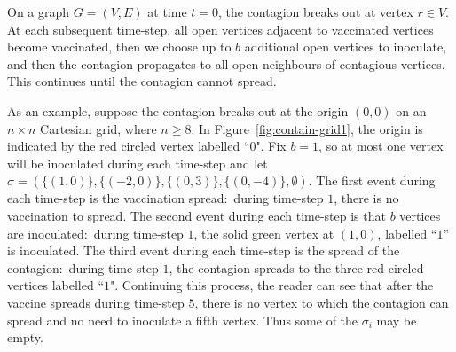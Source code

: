 \documentclass[unknownkeysallowed]{article}
\makeatletter
\theoremstyle{definition}\newtheorem{strategy}{Strategy}
\theoremstyle{definition}\newtheorem{notation}{Notation}[theorem]
\newcommand{\name}[1]{\gdef\@name{#1}}%
\newcommand{\instance}[1]{\gdef\@instance{#1}}%
\newcommand{\question}[1]{\gdef\@question{#1}}%
\newcommand*{\IV}{\textup{\textsc{InfectVax}}\xspace}
\makeatother
\begin{document}
On a graph $G=(V, E)$ at time $t=0$, the contagion breaks out at vertex $r\in V$. At each subsequent time-step, all open vertices adjacent to vaccinated vertices become vaccinated, then we choose up to $b$ additional open vertices to inoculate, and then the contagion propagates to all open neighbours of contagious vertices. This continues until the contagion cannot spread. 

\begin{problem}
    \name{\IV}
      \instance{A graph $G=(V, E)$, a root vertex $r\in V$, a budget $b\in\mathbb{N}$ and target $k\in\mathbb{N}$.}
      \question{If the contagion breaks out at $r$ in time-step $0$ and in each subsequent time-step $t>0$:
      \begin{itemize}[nosep]
          \item each open neighbour of each vaccinated vertex becomes vaccinated, then
          \item we select up to $b$ open vertices to inoculate, and then
          \item each open neighbour of each contagious vertex becomes infected,
      \end{itemize}
      is there a strategy $\sigma$, 
      such that:
      \begin{itemize}[nosep]
        \item after time $|\sigma|$, no open vertex is adjacent to a contagious vertex, and
        \item at least $k$ vertices are saved by time $|\sigma|$?
      \end{itemize}}
\end{problem}

\smallskip

As an example, suppose the contagion breaks out at the origin $(0,0)$ on an $n \times n$ Cartesian grid, where $n \geq 8$.  In Figure~\ref{fig:contain-grid1}, the origin is indicated by the red circled vertex labelled ``$0$".  Fix $b=1$, so at most one vertex will be inoculated during each time-step and let $\sigma = ( \{(1,0)\}, \{(-2,0)\}, \{(0,3)\}, \{(0,-4)\}, \emptyset)$.    The first event during each time-step is  the vaccination spread:\ during time-step $1$, there is no vaccination to spread.  The second event during each time-step is that $b$ vertices are inoculated:\ during time-step $1$, the solid green vertex at $(1,0)$, labelled ``$1$'' is inoculated.  The third event during each time-step is the spread of the contagion:\ during time-step $1$, the contagion spreads to the three red circled vertices labelled ``$1$".  Continuing this process, the reader can see that after the vaccine spreads during time-step $5$, there is no vertex to which the contagion can spread and no need to inoculate a fifth vertex. Thus some of the $\sigma_i$ may be empty.
\end{document}
